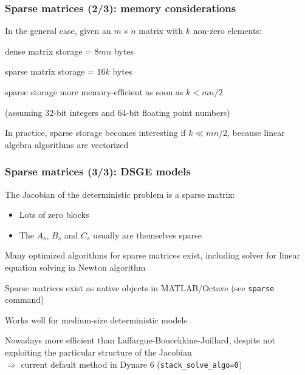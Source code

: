 \documentclass[handout,usepdftitle=false,xcolor=dvipsnames,aspectratio=169]{beamer}
\begin{document}
\begin{frame}
  \frametitle{Sparse matrices (2/3): memory considerations}
  \begin{witemize}
    \item In the general case, given an $m\times n$ matrix with $k$ non-zero
    elements:
    \begin{witemize}
      \item dense matrix storage = $8mn$ bytes
      \item sparse matrix storage = $16k$ bytes
      \item sparse storage more memory-efficient as soon as $k < mn/2$
    \end{witemize}
    (assuming 32-bit integers and 64-bit floating point numbers)
    \item In practice, sparse storage becomes interesting if $k \ll mn/2$, because
    linear algebra algorithms are vectorized
  \end{witemize}
\end{frame}

\begin{frame}
  \frametitle{Sparse matrices (3/3): DSGE models}
  \begin{witemize}
    \item The Jacobian of the deterministic problem is a sparse matrix:
    \begin{itemize}
      \item Lots of zero blocks
      \item The $A_s$, $B_s$ and $C_s$ usually are themselves sparse
    \end{itemize}
    \item Many optimized algorithms for sparse matrices exist, including solver for linear equation solving in Newton algorithm
    \item Sparse matrices exist as native objects in MATLAB/Octave (see \texttt{sparse} command)
    \item Works well for medium-size deterministic models
    \item Nowadays more efficient than Laffargue-Boucekkine-Juillard, despite not exploiting the particular structure of the Jacobian \\
    $\Rightarrow$ current default method in Dynare 6 (\texttt{stack\_solve\_algo=0})

  \end{witemize}

\end{frame}
\end{document}
